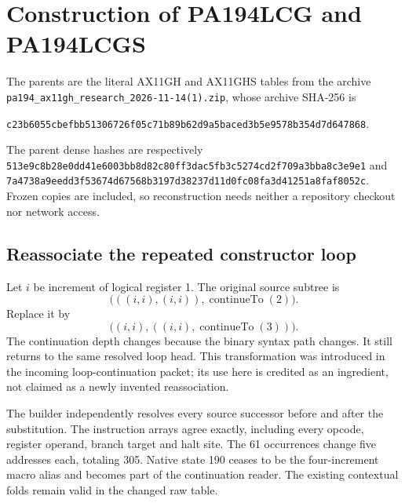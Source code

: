 \documentclass[11pt,letterpaper]{article}
\newcommand{\file}[1]{\nolinkurl{#1}}
\begin{document}


\section{Construction of PA194LCG and PA194LCGS}
\label{sec:construction}
The parents are the literal AX11GH and AX11GHS tables from the archive
\file{pa194_ax11gh_research_2026-11-14(1).zip}, whose archive SHA-256 is
\begin{center}\small
\nolinkurl{c23b6055cbefbb51306726f05c71b89b62d9a5baced3b5e9578b354d7d647868}.
\end{center}
The parent dense hashes are respectively
\nolinkurl{513e9c8b28e0dd41e6003bb8d82c80ff3dac5fb3c5274cd2f709a3bba8c3e9e1}
and
\nolinkurl{7a4738a9eedd3f53674d67568b3197d38237d11d0fc08fa3d41251a8faf8052c}.
Frozen copies are included, so reconstruction needs neither a repository
checkout nor network access.

\subsection{Reassociate the repeated constructor loop}
Let $i$ be increment of logical register 1. The original source subtree is
\[
\bigl(((i,i),(i,i)),\operatorname{continueTo}(2)\bigr).
\]
Replace it by
\[
\bigl((i,i),((i,i),\operatorname{continueTo}(3))\bigr).
\]
The continuation depth changes because the binary syntax path changes.
It still returns to the same resolved loop head. This transformation was
introduced in the incoming loop-continuation packet; its use here is
credited as an ingredient, not claimed as a newly invented reassociation.

The builder independently resolves every source successor before and after
the substitution. The instruction arrays agree exactly, including every
opcode, register operand, branch target and halt site. The 61 occurrences
change five addresses each, totaling 305. Native state 190 ceases to be
the four-increment macro alias and becomes part of the continuation reader.
The existing contextual folds remain valid in the changed raw table.
\end{document}
